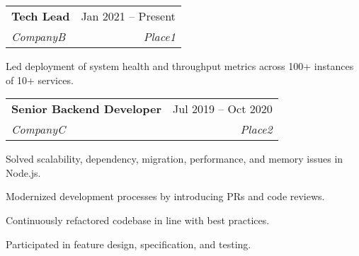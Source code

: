 \documentclass[a4paper,11pt]{article}
\makeatletter
\newcommand{\placeblock}[4]{%
    \vspace{-2pt}\item%
    \begin{tabular*}{0.97\textwidth}[t]{l@{\extracolsep{\fill}}r}%
        \textbf{#1} & #2 \\%
        \textit{\small#3} & \textit{\small #4} \\%
    \end{tabular*}\vspace{-7pt}%
}%
\newenvironment*{place}[4]{%
    \placeblock{#1}{#2}{#3}{#4}
    \begin{itemList}
}{%
    \end{itemList}
}%
\newcommand{\reflectiz}{Reflectiz}
\newcommand{\appdome}{Appdome}
\newcommand{\ramatgan}{Ramat Gan, Israel}
\newcommand{\telaviv}{Tel Aviv}
\renewcommand{\reflectiz}{CompanyB}
\renewcommand{\appdome}{CompanyC}
\renewcommand{\ramatgan}{Place1}
\renewcommand{\telaviv}{Place2}
\newenvironment{jobReflectizLead}{%
    \begin{place}{Tech Lead}{Jan 2021 -- Present}{\reflectiz}{\ramatgan}
}{%
    \end{place}
}
\newenvironment{jobAppdome}{%
    \begin{place}{Senior Backend Developer}{Jul 2019 -- Oct 2020}{\appdome}{\telaviv}
}{
    \end{place}
}
\makeatother
\begin{document}
\begin{sectionList}
\begin{jobReflectizLead}
        \item Led deployment of system health and throughput metrics across 100+ instances of 10+ services.
     \end{jobReflectizLead}

    \begin{jobAppdome}
        \item Solved scalability, dependency, migration, performance, and memory issues in Node.js.
        \item Modernized development processes by introducing PRs and code reviews.
        \item Continuously refactored codebase in line with best practices.
        \item Participated in feature design, specification, and testing.
    \end{jobAppdome}


\end{sectionList}
\end{document}
